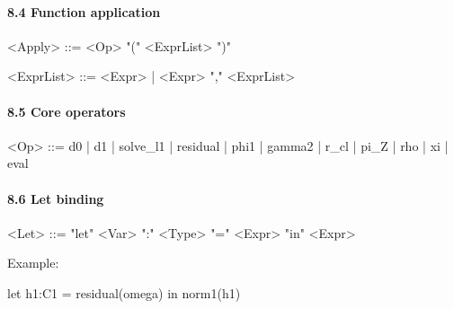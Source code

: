 \documentclass[
]{article}
\newenvironment{Shaded}{\begin{snugshade}}{\end{snugshade}}
\newcommand{\NormalTok}[1]{\textcolor[rgb]{0.12,0.11,0.11}{#1}}
\begin{document}
\paragraph{8.4 Function application}\label{function-application}

\begin{Shaded}
\begin{Highlighting}[]
\NormalTok{\textless{}Apply\textgreater{} ::= \textless{}Op\textgreater{} "(" \textless{}ExprList\textgreater{} ")"}

\NormalTok{\textless{}ExprList\textgreater{} ::= \textless{}Expr\textgreater{} | \textless{}Expr\textgreater{} "," \textless{}ExprList\textgreater{}}
\end{Highlighting}
\end{Shaded}

\paragraph{8.5 Core operators}\label{core-operators}

\begin{Shaded}
\begin{Highlighting}[]
\NormalTok{\textless{}Op\textgreater{} ::=}
\NormalTok{    d0}
\NormalTok{  | d1}
\NormalTok{  | solve\_l1}
\NormalTok{  | residual}
\NormalTok{  | phi1}
\NormalTok{  | gamma2}
\NormalTok{  | r\_cl}
\NormalTok{  | pi\_Z}
\NormalTok{  | rho}
\NormalTok{  | xi}
\NormalTok{  | eval}
\end{Highlighting}
\end{Shaded}

\paragraph{8.6 Let binding}\label{let-binding}

\begin{Shaded}
\begin{Highlighting}[]
\NormalTok{\textless{}Let\textgreater{} ::= "let" \textless{}Var\textgreater{} ":" \textless{}Type\textgreater{} "=" \textless{}Expr\textgreater{} "in" \textless{}Expr\textgreater{}}
\end{Highlighting}
\end{Shaded}

Example:

\begin{Shaded}
\begin{Highlighting}[]
\NormalTok{let h1:C1 = residual(omega) in norm1(h1)}
\end{Highlighting}
\end{Shaded}
\end{document}
